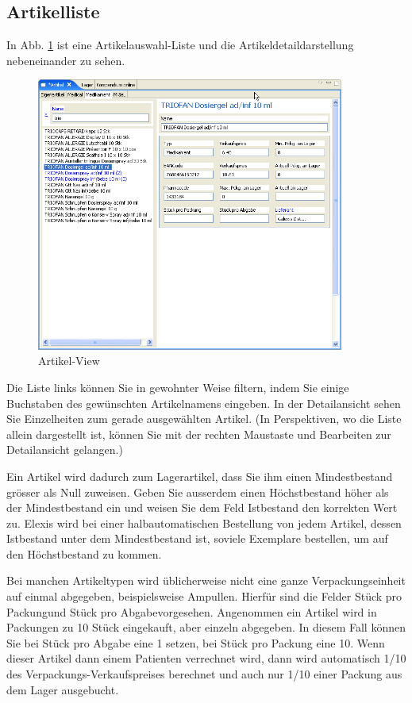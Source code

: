 \subsection{Artikelliste}
In Abb. \ref{fig:artikel} ist eine Artikelauswahl-Liste und die
Artikeldetaildarstellung nebeneinander zu sehen.

\begin{figure}[htp]
\begin{center}
  \includegraphics[width=0.9\textwidth]{images/artikelview}
  \caption{Artikel-View}
  \label{fig:artikel}
\end{center}
\end{figure}
Die Liste links können Sie in gewohnter Weise filtern, indem Sie einige
Buchstaben des gewünschten Artikelnamens eingeben.
In der Detailansicht sehen Sie Einzelheiten zum gerade ausgewählten Artikel. (In
Perspektiven, wo die Liste allein dargestellt ist, können Sie mit der rechten
Maustaste und \glqq Bearbeiten\grqq{} zur Detailansicht gelangen.)

Ein Artikel wird dadurch zum Lagerartikel, dass Sie ihm einen Mindestbestand
grösser als Null zuweisen. Geben Sie ausserdem einen Höchstbestand höher als der
Mindestbestand ein und weisen Sie dem Feld \glqq Istbestand\grqq{} den korrekten
Wert zu. Elexis wird bei einer halbautomatischen Bestellung von jedem Artikel,
dessen Istbestand unter dem Mindestbestand ist, soviele Exemplare bestellen, um
auf den Höchstbestand zu kommen.

Bei manchen Artikeltypen wird üblicherweise nicht eine ganze Verpackungseinheit
auf einmal abgegeben, beispielsweise Ampullen. Hierfür sind die Felder \glqq
Stück pro Packung\grqq{}und \glqq Stück pro Abgabe\grqq{}vorgesehen. Angenommen
ein Artikel wird in Packungen zu 10 Stück eingekauft, aber einzeln abgegeben.
In diesem Fall können Sie bei Stück pro Abgabe eine 1 setzen, bei Stück pro
Packung eine 10. Wenn dieser Artikel dann einem Patienten verrechnet wird, dann
wird automatisch 1/10 des Verpackungs-Verkaufspreises berechnet und auch nur
1/10 einer Packung aus dem Lager ausgebucht.

